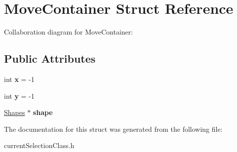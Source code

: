 \hypertarget{structMoveContainer}{}\section{Move\+Container Struct Reference}
\label{structMoveContainer}


Collaboration diagram for Move\+Container\+:
\subsection*{Public Attributes}
\begin{DoxyCompactItemize}
\item 
int {\bfseries x} = -\/1\hypertarget{structMoveContainer_a1595d210a5c49a49cf255e5ff75b6c4b}{}\label{structMoveContainer_a1595d210a5c49a49cf255e5ff75b6c4b}

\item 
int {\bfseries y} = -\/1\hypertarget{structMoveContainer_ac848fa0070b1d7d5343178cafee992d4}{}\label{structMoveContainer_ac848fa0070b1d7d5343178cafee992d4}

\item 
\hyperlink{classShapes}{Shapes} $\ast$ {\bfseries shape}\hypertarget{structMoveContainer_a5d78701071aa521a3ca5293a42271919}{}\label{structMoveContainer_a5d78701071aa521a3ca5293a42271919}

\end{DoxyCompactItemize}


The documentation for this struct was generated from the following file\+:\begin{DoxyCompactItemize}
\item 
current\+Selection\+Class.\+h\end{DoxyCompactItemize}
